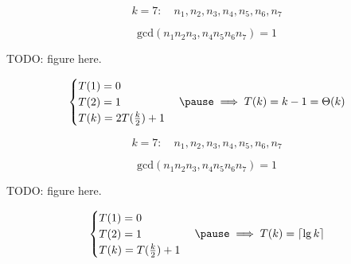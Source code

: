 \begin{frame}{}

  \[
	k = 7: \quad n_1, n_2, n_3, n_4, n_5, n_6, n_7
  \]

  \pause
  \[
    \text{gcd}(n_1n_2n_3, n_4n_5n_6n_7) = 1
  \]

  \centerline{TODO: figure here.}

  \begin{equation*}
	\begin{cases}
	  T(1) = 0 \\
	  T(2) = 1 \\
	  T(k) = 2T(\frac{k}{2}) + 1
	\end{cases}\pause \implies T(k) = k - 1 = \Theta(k)
  \end{equation*}


\end{frame}
\begin{frame}{} %
  \[
	k = 7: \quad n_1, n_2, n_3, n_4, n_5, n_6, n_7
  \]

  \pause
  \[
    \text{gcd}(n_1n_2n_3, n_4n_5n_6n_7) = 1
  \]

  \centerline{TODO: figure here.}

  \begin{equation*}
	\begin{cases}
	  T(1) = 0 \\
	  T(2) = 1 \\
	  T(k) = T(\frac{k}{2}) + 1
	\end{cases}\pause \implies T(k) = \lceil \lg k \rceil
  \end{equation*}
\end{frame}
